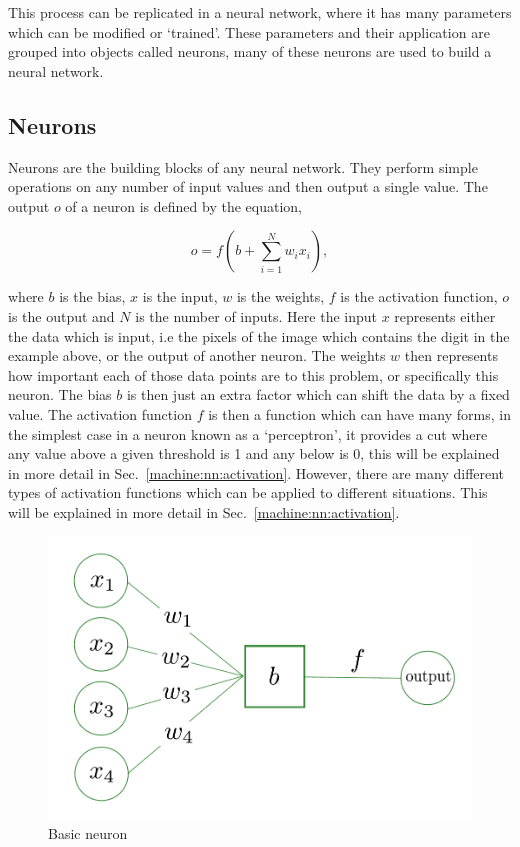 This process can be replicated in a neural network, where it has many parameters which can be modified or `trained'. 
These parameters and their application are grouped into objects called neurons, many of these neurons are used to build a neural network.

\subsection{\label{machine:nn:neuron}Neurons}

Neurons are the building blocks of any neural network.
They perform simple operations on any number of input values and then output a single value.
The output $o$ of a neuron is defined by the equation,

\begin{equation}
    o = f\left(b + \sum_{i=1}^{N} w_i x_i  \right),
    \label{machine:nn:neuron:equation}
\end{equation}

where $b$ is the bias, $x$ is the input, $w$ is the weights, $f$ is the activation function, $o$ is the output and $N$ is the number of inputs.
Here the input $x$ represents either the data which is input, i.e the pixels of the image which contains the digit in the example above, or the output of another neuron.
The weights $w$ then represents how important each of those data points are to this problem, or specifically this neuron. 
The bias $b$ is then just an extra factor which can shift the data by a fixed value.
The activation function $f$ is then a function which can have many forms, in the simplest case in a neuron known as a `perceptron', it provides a cut where any value above a given threshold is 1 and any below is 0, this will be explained in more detail in Sec.~\ref{machine:nn:activation}. 
However, there are many different types of activation functions which can be applied to different situations.
This will be explained in more detail in Sec.~\ref{machine:nn:activation}.

\begin{figure}[h]
    \centering
    \includegraphics[width=0.6\columnwidth]{C4_cnn/neuron.pdf}
    \caption{Basic neuron}
    \label{machine:nn:neuron:plot}
\end{figure}

